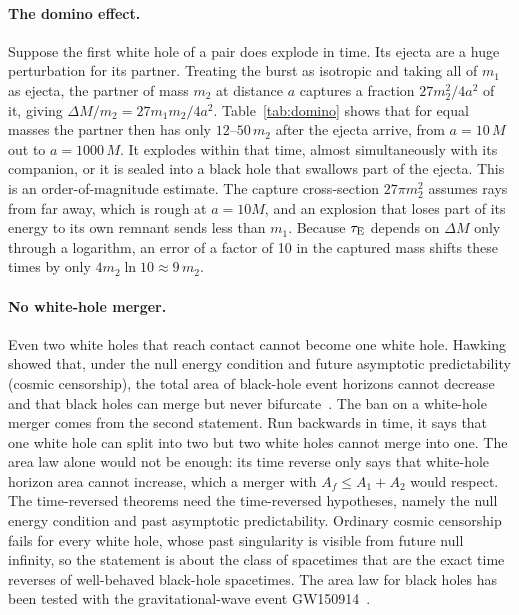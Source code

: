 \documentclass[11pt,a4paper]{article}
\newcommand{\dM}{\Delta M}
\newcommand{\tauE}{\tau_{\rm E}}
\begin{document}
\paragraph{The domino effect.} Suppose the first white hole of a pair does explode in time. Its ejecta are a huge perturbation for its partner. Treating the burst as isotropic and taking all of $m_1$ as ejecta, the partner of mass $m_2$ at distance $a$ captures a fraction $27m_2^2/4a^2$ of it, giving $\dM/m_2 = 27 m_1 m_2/4a^2$. Table~\ref{tab:domino} shows that for equal masses the partner then has only $12$--$50\,m_2$ after the ejecta arrive, from $a=10\,M$ out to $a=1000\,M$. It explodes within that time, almost simultaneously with its companion, or it is sealed into a black hole that swallows part of the ejecta. This is an order-of-magnitude estimate. The capture cross-section $27\pi m_2^2$ assumes rays from far away, which is rough at $a=10M$, and an explosion that loses part of its energy to its own remnant sends less than $m_1$. Because $\tauE$ depends on $\dM$ only through a logarithm, an error of a factor of 10 in the captured mass shifts these times by only $4m_2\ln10 \approx 9\,m_2$.

\paragraph{No white-hole merger.} Even two white holes that reach contact cannot become one white hole. Hawking showed that, under the null energy condition and future asymptotic predictability (cosmic censorship), the total area of black-hole event horizons cannot decrease~\cite{Hawking1971} and that black holes can merge but never bifurcate~\cite{Hawking1972,HawkingEllis}. The ban on a white-hole merger comes from the second statement. Run backwards in time, it says that one white hole can split into two but two white holes cannot merge into one. The area law alone would not be enough: its time reverse only says that white-hole horizon area cannot increase, which a merger with $A_f \le A_1 + A_2$ would respect. The time-reversed theorems need the time-reversed hypotheses, namely the null energy condition and past asymptotic predictability. Ordinary cosmic censorship fails for every white hole, whose past singularity is visible from future null infinity, so the statement is about the class of spacetimes that are the exact time reverses of well-behaved black-hole spacetimes. The area law for black holes has been tested with the gravitational-wave event GW150914~\cite{Isi2021}.
\end{document}
